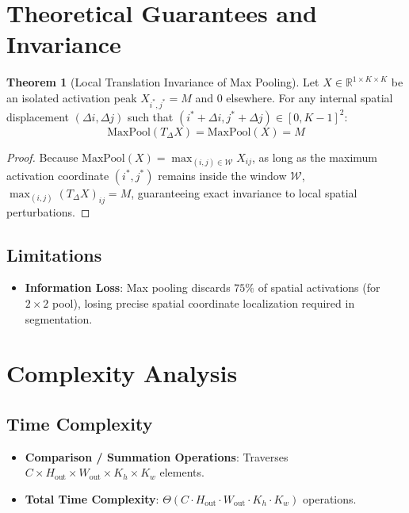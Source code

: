 \documentclass[11pt,a4paper]{article}
\theoremstyle{definition}
\newtheorem{theorem}{Theorem}[section]
\begin{document}
\section{Theoretical Guarantees and Invariance}

\begin{theorem}[Local Translation Invariance of Max Pooling]
Let $X \in \mathbb{R}^{1 \times K \times K}$ be an isolated activation peak $X_{i^*, j^*} = M$ and $0$ elsewhere. For any internal spatial displacement $(\Delta i, \Delta j)$ such that $(i^* + \Delta i, j^* + \Delta j) \in [0, K-1]^2$:
\begin{equation}
\text{MaxPool}(T_\Delta X) = \text{MaxPool}(X) = M
\end{equation}
\end{theorem}

\begin{proof}
Because $\text{MaxPool}(X) = \max_{(i, j) \in \mathcal{W}} X_{ij}$, as long as the maximum activation coordinate $(i^*, j^*)$ remains inside the window $\mathcal{W}$, $\max_{(i, j)} (T_\Delta X)_{ij} = M$, guaranteeing exact invariance to local spatial perturbations.
\end{proof}

\subsection{Limitations}
\begin{itemize}
    \item \textbf{Information Loss}: Max pooling discards $75\%$ of spatial activations (for $2 \times 2$ pool), losing precise spatial coordinate localization required in segmentation.
\end{itemize}

\section{Complexity Analysis}

\subsection{Time Complexity}
\begin{itemize}
    \item \textbf{Comparison / Summation Operations}: Traverses $C \times H_{\text{out}} \times W_{\text{out}} \times K_h \times K_w$ elements.
    \item \textbf{Total Time Complexity}: $\Theta(C \cdot H_{\text{out}} \cdot W_{\text{out}} \cdot K_h \cdot K_w)$ operations.
\end{itemize}
\end{document}
